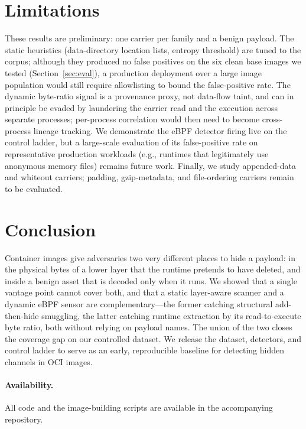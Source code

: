 \documentclass[sigconf,nonacm]{acmart}
\begin{document}
\section{Limitations}
\label{sec:limitations}
These results are preliminary: one carrier per family and a benign payload. The
static heuristics (data-directory location lists, entropy threshold) are tuned to
the corpus; although they produced no false positives on the six clean base images
we tested (Section~\ref{sec:eval}), a production deployment over a large image
population would still require allowlisting to bound the false-positive rate. The
dynamic byte-ratio signal is a provenance proxy, not data-flow taint, and can in
principle be evaded by laundering the carrier read and the execution across
separate processes; per-process correlation would then need to become
cross-process lineage tracking. We demonstrate the eBPF detector firing live on
the control ladder, but a large-scale evaluation of its false-positive rate on
representative production workloads (e.g., runtimes that legitimately use
anonymous memory files) remains future work. Finally, we study appended-data and
whiteout carriers; padding, gzip-metadata, and file-ordering carriers remain to be
evaluated.

\section{Conclusion}
Container images give adversaries two very different places to hide a payload: in
the physical bytes of a lower layer that the runtime pretends to have deleted, and
inside a benign asset that is decoded only when it runs. We showed that a single
vantage point cannot cover both, and that a static layer-aware scanner and a
dynamic eBPF sensor are complementary---the former catching structural
add-then-hide smuggling, the latter catching runtime extraction by its
read-to-execute byte ratio, both without relying on payload names. The union of
the two closes the coverage gap on our controlled dataset. We release the dataset,
detectors, and control ladder to serve as an early, reproducible baseline for
detecting hidden channels in OCI images.

\paragraph{Availability.} All code and the image-building scripts are available in
the accompanying repository.
\end{document}
